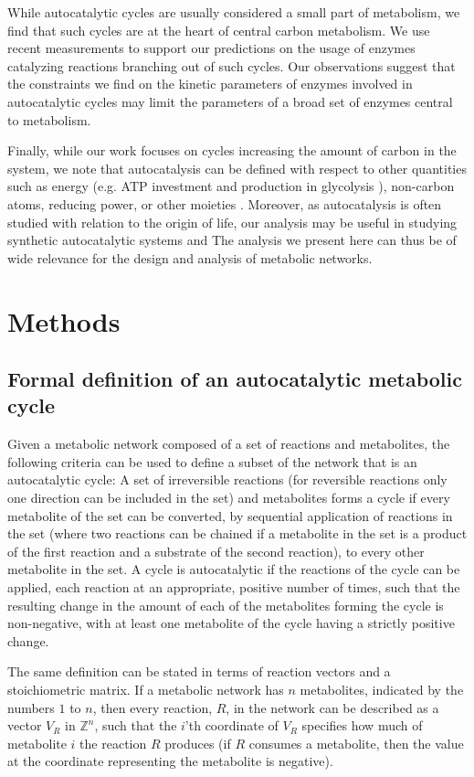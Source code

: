 While autocatalytic cycles are usually considered a small part of metabolism, we find that such cycles are at the heart of central carbon metabolism.
We use recent measurements to support our predictions on the usage of enzymes catalyzing reactions branching out of such cycles.
Our observations suggest that the constraints we find on the kinetic parameters of enzymes involved in autocatalytic cycles may limit the parameters of a broad set of enzymes central to metabolism.

Finally, while our work focuses on cycles increasing the amount of carbon in the system, we note that autocatalysis can be defined with respect to other quantities such as energy (e.g. ATP investment and production in glycolysis \cite{Teusink1998-he}), non-carbon atoms, reducing power, or other moieties \cite{Reich1981-qd}.
  Moreover, as autocatalysis is often studied with relation to the origin of life, our analysis may be useful in studying synthetic autocatalytic systems \cite{Semenov2016-ol} and 
  The analysis we present here can thus be of wide relevance for the design and analysis of metabolic networks.

  \section{Methods}
  \subsection{Formal definition of an autocatalytic metabolic cycle}
  Given a metabolic network composed of a set of reactions and metabolites, the following criteria can be used to define a subset of the network that is an autocatalytic cycle:
A set of irreversible reactions (for reversible reactions only one direction can be included in the set) and metabolites forms a cycle if every metabolite of the set can be converted, by sequential application of reactions in the set (where two reactions can be chained if a metabolite in the set is a product of the first reaction and a substrate of the second reaction), to every other metabolite in the set.
A cycle is autocatalytic if the reactions of the cycle can be applied, each reaction at an appropriate, positive number of times, such that the resulting change in the amount of each of the metabolites forming the cycle is non-negative, with at least one metabolite of the cycle having a strictly positive change.

The same definition can be stated in terms of reaction vectors and a stoichiometric matrix.
If a metabolic network has $n$ metabolites, indicated by the numbers $1$ to $n$, then every reaction, $R$, in the network can be described as a vector $V_R$ in $\mathbb{Z}^n$, such that the $i$'th coordinate of $V_R$ specifies how much of metabolite $i$ the reaction $R$ produces (if $R$ consumes a metabolite, then the value at the coordinate representing the metabolite is negative).

